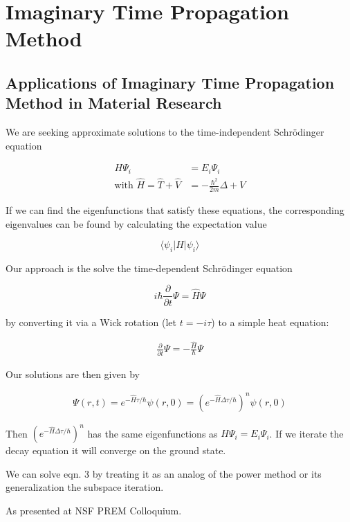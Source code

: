 \documentclass[12pt,]{book}
\begin{document}
\chapter{Imaginary Time Propagation Method}

\section{Applications of Imaginary Time Propagation Method in Material
Research}\label{applications-of-imaginary-time-propagation-method-in-material-research}

We are seeking approximate solutions to the time-independent Schrödinger
equation

\begin{align*}
H\Psi_i&=E_i\Psi_i\tag{eqn. 1}\\
\text{with }\hat{H}=\hat T + \hat V &= -\frac{\hbar^2}{2m}\Delta + V
\end{align*}

If we can find the eigenfunctions that satisfy these equations, the
corresponding eigenvalues can be found by calculating the expectation
value

\[\langle \psi_i \rvert H \rvert \psi_i \rangle\]

Our approach is the solve the time-dependent Schrödinger equation

\[i\hbar\frac{\partial}{\partial t}\Psi = \hat H \Psi\]

by converting it via a Wick rotation (let \(t=-i\tau\)) to a simple heat
equation:

\begin{align*}
\frac{\partial}{\partial t}\Psi=-\frac{\hat H}{\hbar}\Psi\tag{eqn. 2}
\end{align*}

Our solutions are then given by

\begin{align*}\Psi(r,t)=e^{-\hat H\tau/\hbar}\psi(r,0)=\left(e^{-\hat H\Delta\tau/\hbar}\right)^n\psi(r,0)\tag{eqn. 3}\end{align*}

Then \(\left(e^{-\hat H\Delta\tau/\hbar}\right)^n\) has the same
eigenfunctions as \(H\Psi_i=E_i\Psi_i\). If we iterate the decay
equation it will converge on the ground state.

We can solve eqn. 3 by treating it as an analog of the power method or
its generalization the subspace iteration.

As presented at NSF PREM Colloquium.
\end{document}
